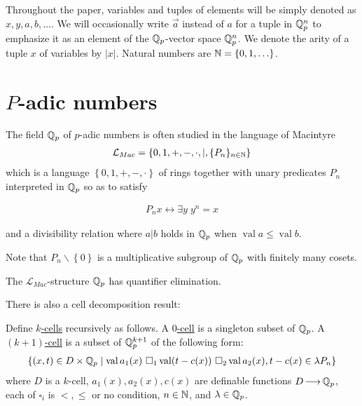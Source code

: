 \documentclass{amsart}
\newcommand{\LLM}{\mathcal L_{Mac}}
\newcommand{\curly}[1]{\left\{#1\right\}}
\DeclareMathOperator{\vval}{val}
\newcommand{\defn}{\underline}
\begin{document}
Throughout the paper, variables and tuples of elements will be simply denoted as $x, y, a, b, \ldots$.
We will occasionally write $\vec a$ instead of $a$ for a tuple in $\mathbb{Q}_p^n$ to emphasize it as an element of the $\mathbb{Q}_p$-vector space $\mathbb{Q}_p^n$.
We denote the arity of a tuple $x$ of variables by $|x|$.
Natural numbers are $\N = \curly{0, 1, \ldots}$.





\section{$P$-adic numbers}


The field $\mathbb{Q}_p$ of $p$-adic numbers is often studied in the language of Macintyre 
  \begin{align*}
	\LLM = \curly{0, 1, +, -, \cdot, |, \{P_n\}_{n \in \N}}
  \end{align*}
which is a language $\curly{0, 1, +, -, \cdot}$ of rings together with unary predicates $P_n$ interpreted in $\mathbb{Q}_p$ so as to satisfy

\begin{align*}
  P_n x \leftrightarrow \exists y \; y^n = x
\end{align*}

and a divisibility relation where $a|b$ holds in $\mathbb{Q}_p$ when $\vval a \leq \vval b$.

Note that $P_n\backslash \curly{0}$ is a multiplicative subgroup of $\mathbb{Q}_p$ with finitely many cosets.

\begin{Theorem} [Macintyre '76]
  The $\LLM$-structure $\mathbb{Q}_p$ has quantifier elimination.
\end{Theorem}

There is also a cell decomposition result:
\begin{Definition}
  Define \defn{$k$-cells} recursively as follows.
  A \defn{$0$-cell} is a singleton subset of $\mathbb{Q}_p$.
  A \defn{$(k+1)$-cell} is a subset of $\mathbb{Q}_p^{k+1}$ of the following form:
  \begin{align*}
    \curly{(x, t) \in D \times \Q_p \mid \vval a_1(x) \ \square_1 \vval (t - c(x)) \ \square_2 \vval a_2(x), t - c(x) \in \lambda P_n}
  \end{align*}
  where $D$ is a $k$-cell,
  $a_1(x), a_2(x), c(x)$ are definable functions $D \operatorname{\longrightarrow} \mathbb{Q}_p$,
  each of $\square_i$ is $<, \leq$ or no condition,
  $n \in \mathbb{N}$,
  and
  $\lambda \in \mathbb{Q}_p$.    
\end{Definition}
\end{document}

